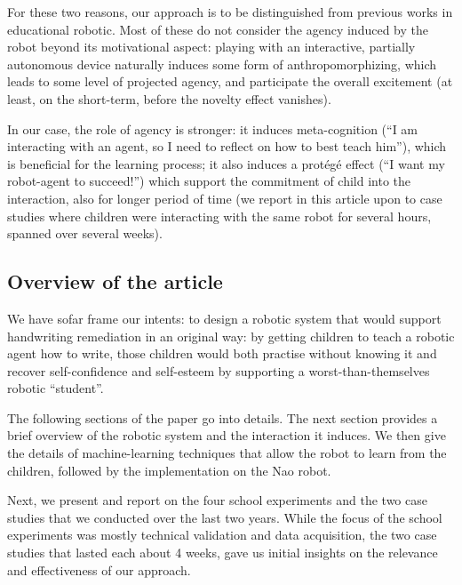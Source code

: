 \documentclass{article}
\begin{document}
For these two reasons, our approach is to be distinguished from previous works in
educational robotic. Most of these do not consider the agency induced by the
robot beyond its motivational aspect: playing with an interactive, partially autonomous
device naturally induces some form of anthropomorphizing, which leads to some
level of projected agency, and participate the overall excitement (at least, on
the short-term, before the novelty effect vanishes).

In our case, the role of agency is stronger: it induces meta-cognition (``I am
interacting with an agent, so I need to reflect on how to best teach him''),
which is beneficial for the learning process; it also induces a protégé effect
(``I want my robot-agent to succeed!'') which support the commitment of child
into the interaction, also for longer period of time (we report in this article
upon to case studies where children were interacting with the same robot for several
hours, spanned over several weeks).

\subsection*{Overview of the article}

We have sofar frame our intents: to design a robotic system that would support
handwriting remediation in an original way: by getting children to teach a
robotic agent how to write, those children would both practise without knowing
it and recover self-confidence and self-esteem by supporting a
worst-than-themselves robotic ``student''.

The following sections of the paper go into details. The next section provides a
brief overview of the robotic system and the interaction it induces. We then
give the details of machine-learning techniques that allow the robot to learn
from the children, followed by the implementation on the Nao robot.

Next, we present and report on the four school experiments and the two case
studies that we conducted over the last two years. While the focus of the school
experiments was mostly technical validation and data acquisition, the two case
studies that lasted each about 4 weeks, gave us initial insights on the
relevance and effectiveness of our approach.

\end{document}
